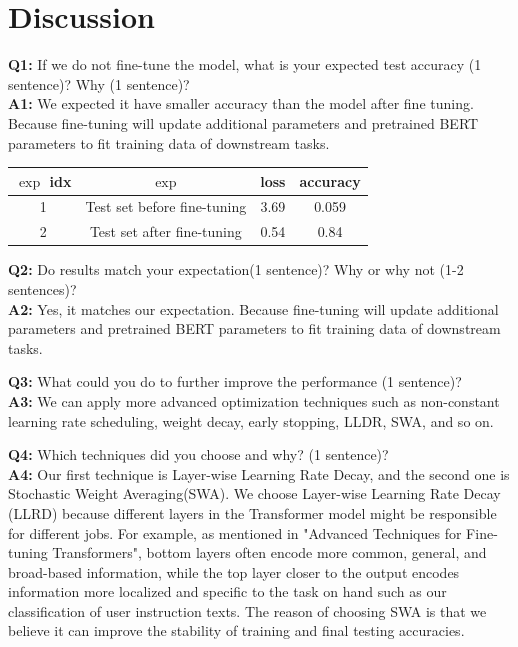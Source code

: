 \documentclass{article}
\begin{document}
    \section{Discussion}
    \textbf{Q1:} If we do not fine-tune the model, what is your expected test accuracy (1 sentence)? Why (1 sentence)?\\
    \textbf{A1:} We expected it have smaller accuracy than the model after fine tuning. Because fine-tuning will update additional parameters and pretrained BERT parameters to fit training data of downstream tasks.

    \begin{tabular}{|c|c|c|c|}
        \hline $\exp$ idx & $\exp$                      & loss & accuracy \\
        \hline 1          & Test set before fine-tuning &   3.69   &     0.059     \\
        2                 & Test set after fine-tuning  &  0.54    &    0.84     \\
        \hline
    \end{tabular}

    \textbf{Q2:} Do results match your expectation(1 sentence)? Why or why not (1-2 sentences)?\\
    \textbf{A2:} Yes, it matches our expectation. Because fine-tuning will update additional parameters and pretrained BERT parameters to fit training data of downstream tasks.

    \textbf{Q3:} What could you do to further improve the performance (1 sentence)?\\
    \textbf{A3:} We can apply more advanced optimization techniques such as non-constant learning rate scheduling, weight decay, early stopping, LLDR, SWA, and so on.

    \textbf{Q4:} Which techniques did you choose and why? (1 sentence)?\\
    \textbf{A4:} Our first technique is Layer-wise Learning Rate Decay, and the second one is Stochastic Weight Averaging(SWA).
    We choose Layer-wise Learning Rate Decay (LLRD) because different layers in the Transformer model might be responsible for different jobs.
    For example, as mentioned in "Advanced Techniques for Fine-tuning Transformers", bottom layers often encode more common, general, and broad-based information,
    while the top layer closer to the output encodes information more localized and specific to the task on hand such as our classification of user instruction texts.
    The reason of choosing SWA is that we believe it can improve the stability of training and final testing accuracies.
\end{document}
